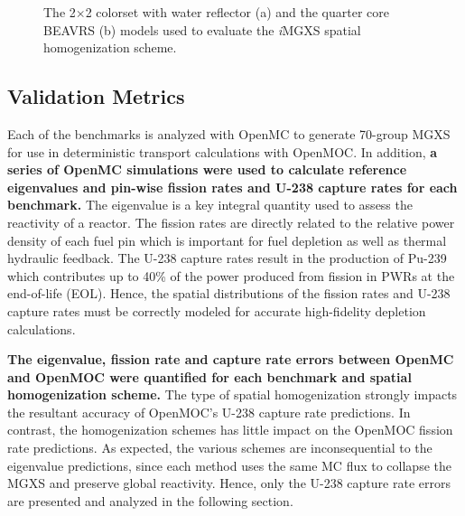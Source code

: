 \documentclass[12pt,twoside]{mitthesis-exec}
\begin{document}
\begin{figure}[h!]
\begin{subfigure}{0.47\textwidth}
  \caption{}
  \label{fig:full-core}
\end{subfigure}
\caption[PWR benchmarks]{The 2$\times$2 colorset with water reflector (a) and the quarter core BEAVRS (b) models used to evaluate the \textit{i}MGXS spatial homogenization scheme.}
\label{fig:benchmarks}
\end{figure}

\subsection*{Validation Metrics}

Each of the benchmarks is analyzed with OpenMC to generate 70-group MGXS for use in deterministic transport calculations with OpenMOC. In addition, \textbf{a series of OpenMC simulations were used to calculate reference eigenvalues and pin-wise fission rates and U-238 capture rates for each benchmark.} The eigenvalue is a key integral quantity used to assess the reactivity of a reactor. The fission rates are directly related to the relative power density of each fuel pin which is important for fuel depletion as well as thermal hydraulic feedback. The U-238 capture rates result in the production of Pu-239 which contributes up to 40\% of the power produced from fission in PWRs at the end-of-life (EOL). Hence, the spatial distributions of the fission rates and U-238 capture rates must be correctly modeled for accurate high-fidelity depletion calculations. 


\textbf{The eigenvalue, fission rate and capture rate errors between OpenMC and OpenMOC were quantified for each benchmark and spatial homogenization scheme.} The type of spatial homogenization strongly impacts the resultant accuracy of OpenMOC's U-238 capture rate predictions. In contrast, the homogenization schemes has little impact on the OpenMOC fission rate predictions. As expected, the various schemes are inconsequential to the eigenvalue predictions, since each method uses the same MC flux to collapse the MGXS and preserve global reactivity. Hence, only the U-238 capture rate errors are presented and analyzed in the following section.

\end{document}
